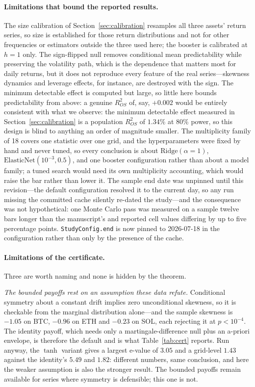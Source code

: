 \documentclass{article}
\theoremstyle{plain}
\theoremstyle{definition}
\newcommand{\rsq}{R^2_{OS}}
\begin{document}
\paragraph{Limitations that bound the reported results.}
The size calibration of Section~\ref{sec:calibration} resamples all three assets' return
series, so size is established for those return distributions and not for other frequencies or
estimators outside the three used here; the booster is calibrated at $h=1$ only. The sign-flipped null removes conditional mean
predictability while preserving the volatility path, which is the dependence that
matters most for daily returns, but it does not reproduce every feature of the real
series---skewness dynamics and leverage effects, for instance, are destroyed with
the sign. The minimum detectable effect is computed but large, so little here
bounds predictability from above: a genuine $\rsq$ of, say, $+0.002$ would be
entirely consistent with what we observe: the minimum detectable effect measured in
Section~\ref{sec:calibration} is a population $\rsq$ of $1.34\%$ at 80\% power, so this
design is blind to anything an order of magnitude smaller. The multiplicity family of 18 covers one
statistic over one grid, and the hyperparameters were fixed by hand and never tuned,
so every conclusion is about $\mathrm{Ridge}(\alpha{=}1)$,
$\mathrm{ElasticNet}(10^{-3}, 0.5)$, and one booster configuration rather than about
a model family; a tuned search would need its own multiplicity accounting, which
would raise the bar rather than lower it. The sample end date was unpinned until
this revision---the default configuration resolved it to the current day, so any run
missing the committed cache silently re-dated the study---and the consequence was not
hypothetical: one Monte Carlo pass was measured on a sample twelve bars longer than
the manuscript's and reported cell values differing by up to five percentage points.
\texttt{StudyConfig.end} is now pinned to 2026-07-18 in the configuration rather than
only by the presence of the cache.

\paragraph{Limitations of the certificate.} Three are worth naming and none is hidden by the
theorem.

\emph{The bounded payoffs rest on an assumption these data refute.} Conditional symmetry about
a constant drift implies zero unconditional skewness, so it is checkable from the marginal
distribution alone---and the sample skewness is $-1.05$ on BTC, $-0.96$ on ETH and $-0.23$ on
SOL, each rejecting it at $p<10^{-4}$. The identity payoff, which needs only a
martingale-difference null plus an a-priori envelope, is therefore the default and is what
Table~\ref{tab:cert} reports. Run anyway, the $\tanh$ variant gives a largest e-value of
$3.05$ and a grid-level $1.43$ against the identity's $5.49$ and $1.82$: different numbers,
same conclusion, and here the weaker assumption is also the stronger result. The bounded
payoffs remain available for series where symmetry is defensible; this one is not.
\end{document}

